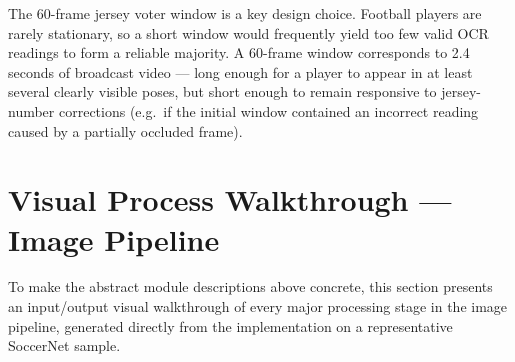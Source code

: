 \begin{table}[H]
    \centering
    \caption{Temporal voter hyperparameters for referee detection and jersey number aggregation.}
    \label{tab:hp-voters}
\end{table}

\noindent The 60-frame jersey voter window is a key design choice.
Football players are rarely stationary, so a short window would
frequently yield too few valid OCR readings to form a reliable majority.
A 60-frame window corresponds to 2.4 seconds of broadcast video ---
long enough for a player to appear in at least several clearly visible
poses, but short enough to remain responsive to jersey-number
corrections (e.g.\ if the initial window contained an incorrect reading
caused by a partially occluded frame).

\section{Visual Process Walkthrough --- Image Pipeline}
\label{sec:image-visual-walkthrough}

To make the abstract module descriptions above concrete, this section
presents an input/output visual walkthrough of every major processing
stage in the image pipeline, generated directly from the implementation
on a representative SoccerNet sample.

